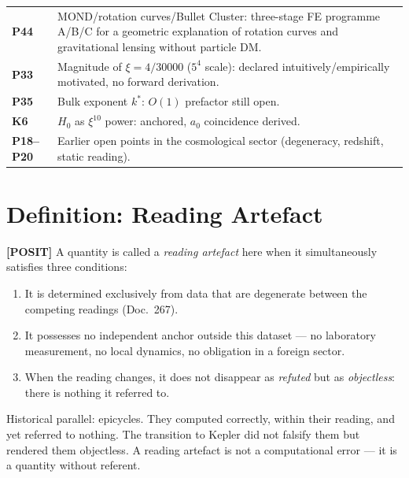 \documentclass[11pt]{report}
\begin{document}
\medskip
\begin{tabular}{@{}lp{10.5cm}}
\textbf{P44}      & MOND/rotation curves/Bullet Cluster: three-stage
                    FE programme A/B/C for a geometric explanation of
                    rotation curves and gravitational lensing without
                    particle DM. \\[4pt]
\textbf{P33}      & Magnitude of $\xi = 4/30000$ ($5^4$ scale):
                    declared intuitively/empirically motivated, no
                    forward derivation. \\[4pt]
\textbf{P35}      & Bulk exponent $k^*$: $O(1)$ prefactor still open. \\[4pt]
\textbf{K6}       & $H_0$ as $\xi^{10}$ power: anchored,
                    $a_0$ coincidence derived. \\[4pt]
\textbf{P18--P20} & Earlier open points in the cosmological sector
                    (degeneracy, redshift, static reading). \\
\end{tabular}

\chapter{Definition: Reading Artefact}

\textbf{[POSIT]} A quantity is called a \emph{reading artefact} here
when it simultaneously satisfies three conditions:

\begin{enumerate}
  \item It is determined exclusively from data that are degenerate
        between the competing readings (Doc.~267).
  \item It possesses no independent anchor outside this dataset —
        no laboratory measurement, no local dynamics, no obligation
        in a foreign sector.
  \item When the reading changes, it does not disappear as
        \emph{refuted} but as \emph{objectless}: there is nothing
        it referred to.
\end{enumerate}

Historical parallel: epicycles. They computed correctly, within their
reading, and yet referred to nothing. The transition to Kepler did not
falsify them but rendered them objectless. A reading artefact is not
a computational error — it is a quantity without referent.
\end{document}
